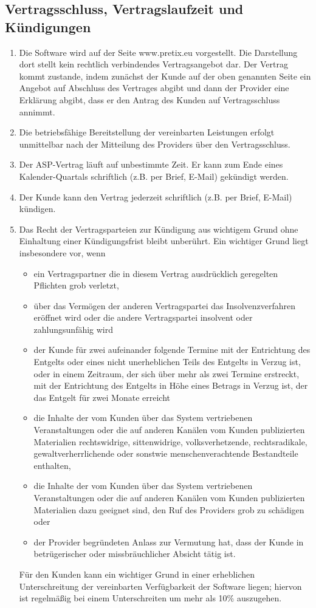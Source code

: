 \documentclass{terms}
\begin{document}
\subsection{Vertragsschluss, Vertragslaufzeit und Kündigungen}
\begin{enumerate}
\item Die Software wird auf der Seite www.pretix.eu vorgestellt. Die Darstellung dort stellt kein rechtlich verbindendes Vertragsangebot dar. Der Vertrag kommt zustande, indem zunächst der Kunde auf der oben genannten Seite ein Angebot auf Abschluss des Vertrages abgibt und dann der Provider eine Erklärung abgibt, dass er den Antrag des Kunden auf Vertragsschluss annimmt. 
\item Die betriebsfähige Bereitstellung der vereinbarten Leistungen erfolgt unmittelbar nach der Mitteilung des Providers über den Vertragsschluss.
\item Der ASP-Vertrag läuft auf unbestimmte Zeit. Er kann zum Ende eines Kalender-Quartals schriftlich (z.B. per Brief, E-Mail) gekündigt werden.
\item Der Kunde kann den Vertrag jederzeit schriftlich (z.B. per Brief, E-Mail) kündigen.
\item Das Recht der Vertragsparteien zur Kündigung aus wichtigem Grund ohne Einhaltung einer Kündigungsfrist bleibt unberührt. Ein wichtiger Grund liegt insbesondere vor, wenn \begin{itemize}
    \item ein Vertragspartner die in diesem Vertrag ausdrücklich geregelten Pflichten grob verletzt,
    \item über das Vermögen der anderen Vertragspartei das Insolvenzverfahren eröffnet wird oder die andere Vertragspartei insolvent oder zahlungsunfähig wird
    \item der Kunde für zwei aufeinander folgende Termine mit der Entrichtung des Entgelts oder eines nicht unerheblichen Teils des Entgelts in Verzug ist, oder in einem Zeitraum, der sich über mehr als zwei Termine erstreckt, mit der Entrichtung des Entgelts in Höhe eines Betrags in Verzug ist, der das Entgelt für zwei Monate erreicht
    \item die Inhalte der vom Kunden über das System vertriebenen Veranstaltungen oder die auf anderen Kanälen vom Kunden publizierten Materialien rechtswidrige, sittenwidrige, volksverhetzende, rechtsradikale, gewaltverherrlichende oder sonstwie menschenverachtende Bestandteile enthalten,
    \item die Inhalte der vom Kunden über das System vertriebenen Veranstaltungen oder die auf anderen Kanälen vom Kunden publizierten Materialien dazu geeignet sind, den Ruf des Providers grob zu schädigen oder
    \item der Provider begründeten Anlass zur Vermutung hat, dass der Kunde in betrügerischer oder missbräuchlicher Absicht tätig ist.
\end{itemize}
    Für den Kunden kann ein wichtiger Grund in einer erheblichen Unterschreitung der vereinbarten Verfügbarkeit der Software liegen; hiervon ist regelmäßig bei einem Unterschreiten um mehr als 10\% auszugehen.
\end{enumerate}
\end{document}
